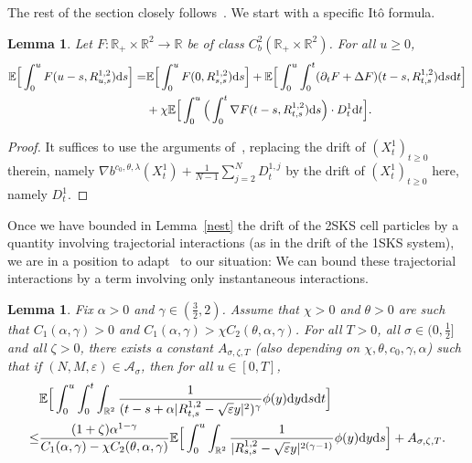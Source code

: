\documentclass[11pt]{article}
\newtheorem{lemma}[theorem]{Lemma}
\newcommand{\E}{\mathbb{E}}
\newcommand{\R}{\mathbb{R}}
\newcommand{\1}{\mathbbm{1}}
\newcommand{\dd}{{\rm d}}
\newcommand{\Aa}{\mathcal A}
\newcommand{\e}{\varepsilon}
\begin{document}
The rest of the section closely follows~\cite{FT1}. We start with a specific Itô formula.

\begin{lemma}\label{lemma:grosIto}
Let $F: \R_+ \times \R^2 \to \R$ be of class $C^{2}_b(\R_+ \times \R^2)$. For all $u\geq 0$,
\begin{align*}
\E \Big[ \int_0^u F(u-s, R^{1,2}_{u,s}) \dd s \Big ] =& \E \Big[ \int_0^u F(0, R^{1,2}_{s,s})
\dd s \Big ] + \E \Big[\int_0^u \int_0^t (\partial_t F + \Delta F) (t-s,R^{1,2}_{t,s})  \dd s \dd t \Big]\\
&+ \chi \E \Big[\int_0^u \Big(\int_0^t \nabla F (t-s, R_{t,s}^{1,2})  \dd s \Big) \cdot D^{1}_t \dd t \Big].
\end{align*}
\end{lemma}

\begin{proof}
It suffices to use the arguments of~\cite[Lemma~10]{FT1}, replacing the drift of $(X^1_t)_{t\geq 0}$ therein,
namely $\nabla b^{c_0,\theta,\lambda}(X^1_t) + \frac1{N-1}\sum_{j=2}^N D^{1,j}_t$ by the drift 
of $(X^1_t)_{t\geq 0}$ here, namely $D^{1}_t$.
\end{proof}

Once we have bounded in Lemma~\ref{nest} the drift of the 2SKS cell particles by a quantity involving trajectorial interactions (as in the drift of the 1SKS system), we are in a position to adapt~\cite[Proposition~11]{FT1} to our situation: 
We can bound these trajectorial interactions by a term involving only instantaneous interactions.

\begin{lemma}\label{lemma:LL}
Fix $\alpha>0$ and $\gamma\in (\frac 32,2)$. Assume that $\chi>0$ and $\theta>0$ are such that
$C_1(\alpha,\gamma)>0$ and $C_1(\alpha,\gamma)>\chi C_2(\theta,\alpha,\gamma)$.
For all $T>0$, all $\sigma\in (0,\frac 12]$ and all $\zeta>0$, there exists a constant $A_{\sigma,\zeta,T}$
(also depending on $\chi,\theta,c_0,\gamma,\alpha$) such that if $(N,M,\e)\in \Aa_\sigma$, then for
all $u \in [0,T]$,
\begin{align*}
&\E\Big[ \int_0^u \int_0^t \int_{\R^2}\frac{1}{(t-s + \alpha |R^{1,2}_{t,s}-\sqrt\e y|^2)^{\gamma}} \phi(y)\dd y\dd s\dd t \Big]\\
\leq& \frac{(1+\zeta)\alpha^{1-\gamma}}{C_1(\alpha,\gamma) -\chi C_2(\theta,\alpha,\gamma)} 
\E\Big[ \int_0^u \int_{\R^2} \frac{1}{|R_{s,s}^{1,2}-\sqrt\e y|^{2(\gamma-1)}}\phi(y)\dd y \dd s\Big] + A_{\sigma,\zeta,T}.
\end{align*}
\end{lemma}
\end{document}
